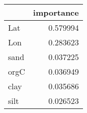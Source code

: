 \begin{tabular}{lr}
\toprule
 & importance \\
\midrule
Lat & 0.579994 \\
Lon & 0.283623 \\
sand & 0.037225 \\
orgC & 0.036949 \\
clay & 0.035686 \\
silt & 0.026523 \\
\bottomrule
\end{tabular}

